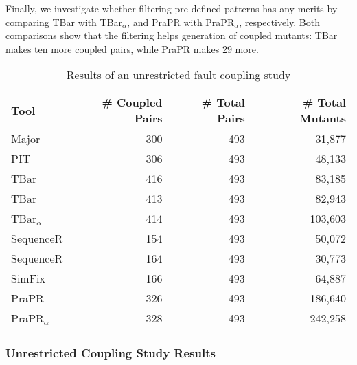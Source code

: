 \documentclass[conference]{IEEEtran}
\newcommand\inv[1]{#1\raisebox{1.15ex}{$\scriptscriptstyle-\!1$}}
\newcommand{\fixme}[1]{\textcolor{red}{\textbf{fixme:}#1}}
\begin{document}

Finally, we investigate whether filtering pre-defined patterns has any merits
by comparing TBar with TBar$_{\alpha}$, and PraPR with PraPR$_{\alpha}$, 
respectively. Both comparisons show that the filtering helps generation of 
coupled mutants: TBar makes ten more coupled pairs, while PraPR makes 29 more. 

\begin{table}[ht]
    \centering
    \caption{Results of an unrestricted fault coupling study}
    \label{tab:RQ3_results_not_sampled}
    \begin{tabular}{lrrr}
        \toprule
        Tool & \# Coupled Pairs & \# Total Pairs & \# Total Mutants  \\
        \midrule

        Major & 300 & 493 & 31,877 \\
        PIT & 306 & 493 & 48,133 \\
        TBar & 416 & 493 & 83,185 \\
        \inv{TBar} & 413 & 493 & 82,943 \\
        TBar$_{\alpha}$ & 414 & 493 & 103,603 \\
        SequenceR  & 154 & 493 & 50,072 \\
        \inv{SequenceR} & 164 & 493 & 30,773 \\
        SimFix & 166 & 493 & 64,887 \\
        PraPR & 326 & 493 & 186,640 \\
        PraPR$_{\alpha}$ & 328 & 493 & 242,258 \\
    
        \bottomrule
    \end{tabular}
\end{table}


\subsubsection{Unrestricted Coupling Study Results}
\end{document}
